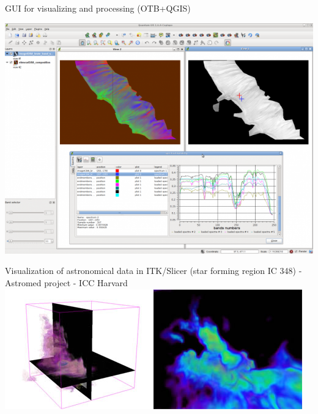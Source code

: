 \begin{frame}{GUI for visualizing and processing (OTB+QGIS)}
  \begin{center}
    \includegraphics[keepaspectratio,height=0.6\paperheight]{images/vahine-qgis.png}
  \end{center}  
\end{frame}

\begin{frame}{Visualization of astronomical data in ITK/Slicer (star forming
    region IC 348) - Astromed project - ICC Harvard}
  \centering
    \includegraphics[height=0.6\paperheight]{images/Astromed1-mj.jpg}
\end{frame}
